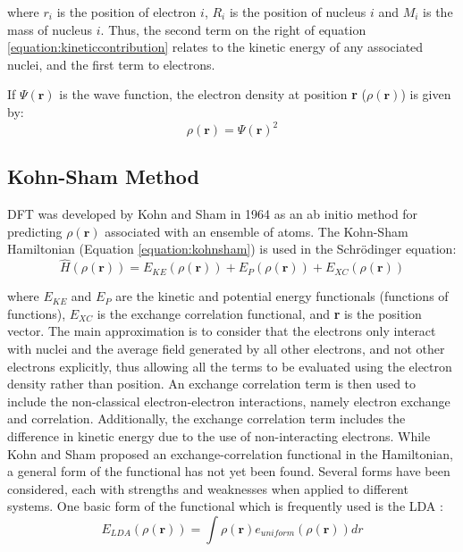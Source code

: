 where $r_{i}$ is the position of electron $i$, $R_{i}$ is the position of nucleus $i$ and $M_{i}$ is the mass of nucleus $i$. Thus, the second term on the right of equation \ref{equation:kineticcontribution} relates to the kinetic energy of any associated nuclei, and the first term to electrons. 

If $\Psi(\textbf{r})$ is the wave function, the electron density at position \textbf{r} ($\rho(\textbf{r})$) is given by:
\begin{equation}
\rho(\textbf{r}) = \Psi(\textbf{r})^2
\end{equation}

\subsection{Kohn-Sham Method} \label{section:kohnsham}

DFT was developed by Kohn and Sham in 1964 \cite{Kohn1965} as an ab initio method for predicting $\rho(\textbf{r})$ associated with an ensemble of atoms. The Kohn-Sham Hamiltonian (Equation \ref{equation:kohnsham}) is used in the Schr\"odinger equation:
\begin{equation}
\hat{H}(\rho(\textbf{r})) = E_{KE}(\rho(\textbf{r})) + E_{P}(\rho(\textbf{r})) + E_{XC}(\rho(\textbf{r}))
\label{equation:kohnsham}
\end{equation}

where $E_{KE}$ and $E_{P}$ are the kinetic and potential energy functionals (functions of functions), $E_{XC}$ is the exchange correlation functional, and \textbf{r} is the position vector. The main approximation is to consider that the electrons only interact with nuclei and the average field generated by all other electrons, and not other electrons explicitly, thus allowing all the terms to be evaluated using the electron density rather than position. An exchange correlation term is then used to include the non-classical electron-electron interactions, namely electron exchange and correlation. Additionally, the exchange correlation term includes the difference in kinetic energy due to the use of non-interacting electrons. While Kohn and Sham proposed an exchange-correlation functional in the Hamiltonian, a general form of the functional has not yet been found. Several forms have been considered, each with strengths and weaknesses when applied to different systems. One basic form of the functional which is frequently used is the LDA \cite{Kohn1965}:
\begin{equation}
E_{LDA}(\rho(\textbf{r})) = \int\rho(\textbf{r})e_{uniform}(\rho(\textbf{r}))dr
\label{equation:LDA}
\end{equation}

